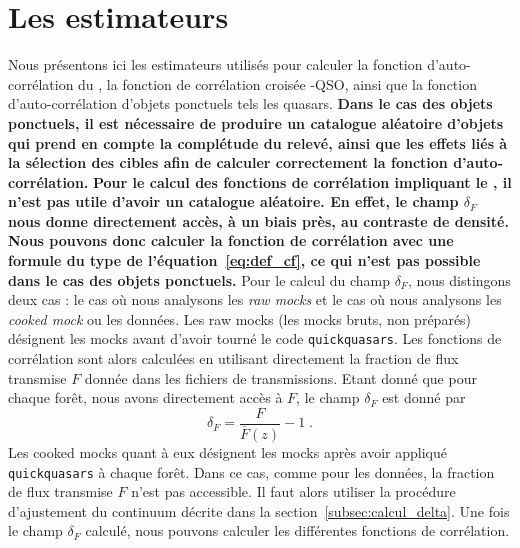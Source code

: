 \documentclass[11pt, twoside, a4paper, openright]{report}
\begin{document}
\section{Les estimateurs}
Nous présentons ici les estimateurs utilisés pour calculer la fonction d'auto-corrélation du \lya{}, la fonction de corrélation croisée \lya{}-QSO, ainsi que la fonction d'auto-corrélation d'objets ponctuels tels les quasars.
\textbf{Dans le cas des objets ponctuels, il est nécessaire de produire un catalogue aléatoire d'objets qui prend en compte la complétude du relevé, ainsi que les effets liés à la sélection des cibles afin de calculer correctement la fonction d'auto-corrélation. %
}
\textbf{Pour le calcul des fonctions de corrélation impliquant le \lya{}, il n'est pas utile d'avoir un catalogue aléatoire. En effet, le champ $\delta_F$ nous donne directement accès, à un biais près, au contraste de densité. Nous pouvons donc calculer la fonction de corrélation avec une formule du type de l'équation~\ref{eq:def_cf}, ce qui n'est pas possible dans le cas des objets ponctuels.}
Pour le calcul du champ $\delta_F$, nous distingons deux cas : le cas où nous analysons les \emph{raw mocks} et le cas où nous analysons les \emph{cooked mock} ou les données.
Les raw mocks (les mocks bruts, non préparés) désignent les mocks avant d'avoir tourné le code \texttt{quickquasars}.
Les fonctions de corrélation sont alors calculées en utilisant directement la fraction de flux transmise $F$ donnée dans les fichiers de transmissions. Etant donné que pour chaque forêt, nous avons directement accès à $F$, le champ $\delta_F$ est donné par
\begin{equation}
  \delta_F = \frac{F}{\overline F(z)} - 1 \; .
\end{equation}
Les cooked mocks quant à eux désignent les mocks après avoir appliqué \texttt{quickquasars} à chaque forêt. Dans ce cas, comme pour les données, la fraction de flux transmise $F$ n'est pas accessible. Il faut alors utiliser la procédure d'ajustement du continuum décrite dans la section~\ref{subsec:calcul_delta}.
Une fois le champ $\delta_F$ calculé, nous pouvons calculer les différentes fonctions de corrélation.
\end{document}
